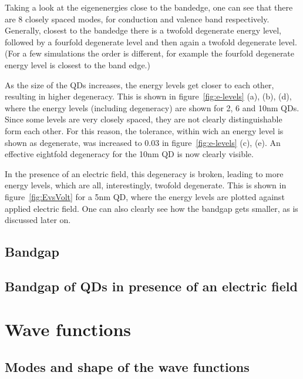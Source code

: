 	Taking a look at the eigenenergies close to the bandedge, one can see that there are 8 closely spaced modes, for conduction and valence band respectively. Generally, closest to the bandedge there is a twofold degenerate energy level, followed by a fourfold degenerate level and then again a twofold degenerate level. (For a few simulations the order is different, for example the fourfold degenerate energy level is closest to the band edge.)
	
	As the size of the QDs increases, the energy levels get closer to each other, resulting in higher degeneracy. This is shown in figure~\ref{fig:e-levels} (a), (b), (d), where the energy levels (including degeneracy) are shown for 2, 6 and 10nm QDs. Since some levels are very closely spaced, they are not clearly distinguishable form each other. For this reason, the tolerance, within wich an energy level is shown as degenerate, was increased to 0.03 in figure~\ref{fig:e-levels} (c), (e). An effective eightfold degeneracy for the 10nm  QD is now clearly visible.
	
	In the presence of an electric field, this degeneracy is broken, leading to more energy levels, which are all, interestingly, twofold degenerate. This is shown in figure~\ref{fig:EvsVolt} for a 5nm QD, where the energy levels are plotted against applied electric field. One can also clearly see how the bandgap gets smaller, as is discussed later on.
\FloatBarrier
\subsection{Bandgap} 

\subsection{Bandgap of QDs in presence of an electric field}

\section{Wave functions}
\subsection{Modes and shape of the wave functions}

